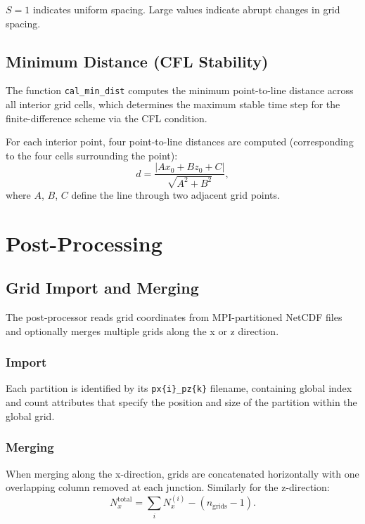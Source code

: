\documentclass[11pt,a4paper]{report}
\begin{document}
$S = 1$ indicates uniform spacing. Large values indicate abrupt changes in grid spacing.

\section{Minimum Distance (CFL Stability)}

The function \texttt{cal\_min\_dist} computes the minimum point-to-line distance across all interior grid cells, which determines the maximum stable time step for the finite-difference scheme via the CFL condition.

For each interior point, four point-to-line distances are computed (corresponding to the four cells surrounding the point):
\begin{equation}
    d = \frac{|A x_0 + B z_0 + C|}{\sqrt{A^2 + B^2}},
\end{equation}
where $A$, $B$, $C$ define the line through two adjacent grid points.

\chapter{Post-Processing}

\section{Grid Import and Merging}

The post-processor reads grid coordinates from MPI-partitioned NetCDF files and optionally merges multiple grids along the x or z direction.

\subsection{Import}

Each partition is identified by its \texttt{px\{i\}\_pz\{k\}} filename, containing global index and count attributes that specify the position and size of the partition within the global grid.

\subsection{Merging}

When merging along the x-direction, grids are concatenated horizontally with one overlapping column removed at each junction. Similarly for the z-direction:
\begin{equation}
    N_x^{\text{total}} = \sum_i N_x^{(i)} - (n_{\text{grids}} - 1).
\end{equation}
\end{document}
